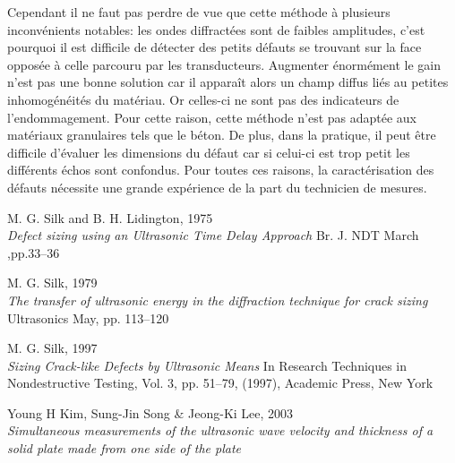 \documentclass[twoside]{article}
\begin{document}
\begin{multicols}{2}
Cependant il ne faut pas perdre de vue que cette méthode à plusieurs inconvénients notables: les ondes diffractées sont de faibles amplitudes, c'est pourquoi il est difficile de détecter des petits défauts se trouvant sur la face opposée à celle parcouru par les transducteurs. Augmenter énormément le gain n'est pas une bonne solution car il apparaît alors un champ diffus liés au petites inhomogénéités du matériau. Or celles-ci ne sont pas des indicateurs de l'endommagement. Pour cette raison, cette méthode n'est pas adaptée aux matériaux granulaires tels que le béton. De plus, dans la pratique, il peut être difficile d'évaluer les dimensions du défaut car si celui-ci est trop petit les différents échos sont confondus. Pour toutes ces raisons, la caractérisation des défauts nécessite une grande expérience de la part du technicien de mesures.


\begin{thebibliography}{99} %
M. G. Silk and B. H. Lidington, 1975 \\
\newblock \emph{ Defect  sizing  using  an Ultrasonic Time Delay Approach}
\newblock Br. J. NDT March ,pp.33–36


M. G. Silk, 1979 \\
\newblock \emph{The transfer of ultrasonic energy in the diffraction technique for crack sizing}
\newblock Ultrasonics May, pp. 113–120


M. G. Silk, 1997 \\
\newblock \emph{Sizing Crack-like Defects by Ultrasonic Means} 
\newblock In Research Techniques in Nondestructive Testing, Vol. 3, pp. 51–79, (1997), Academic Press, New York


Young H Kim, Sung-Jin Song \& Jeong-Ki Lee, 2003 \\
\newblock \emph{ Simultaneous measurements of the ultrasonic wave velocity and thickness of a solid plate made from one side of the plate}




\end{thebibliography}


\end{multicols}
\end{document}
